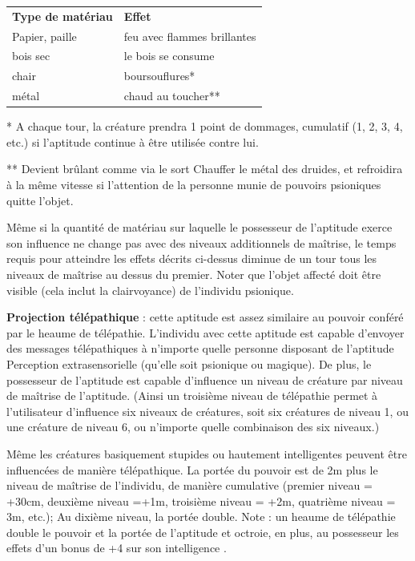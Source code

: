 \documentclass[11pt]{article}
\begin{document}
{\medskip

\begin{tabular}{p{8cm}p{8cm}}
\textbf{Type de matériau} & \textbf{Effet} \\
Papier, paille & feu avec flammes brillantes \\
bois sec & le bois se consume \\
chair & boursouflures* \\
métal & chaud au toucher** \\
\end{tabular}

\bigskip

* A chaque tour, la créature prendra 1 point de dommages, cumulatif (1, 2, 3, 4, etc.) si l'aptitude continue à être utilisée contre lui.

\bigskip

** Devient brûlant comme via le sort Chauffer le métal des druides, et refroidira à la même vitesse si l'attention de la personne munie de pouvoirs psioniques quitte l'objet.

\bigskip

Même si la quantité de matériau sur laquelle le possesseur de l'aptitude exerce son influence ne change pas avec des niveaux additionnels de maîtrise, le temps requis pour atteindre les effets décrits ci-dessus diminue de un tour tous les niveaux de maîtrise au dessus du premier. Noter que l'objet affecté doit être visible (cela inclut la clairvoyance) de l'individu psionique.

\bigskip

\textbf{Projection télépathique} : cette aptitude est assez similaire au pouvoir conféré par le heaume de télépathie. L'individu avec cette aptitude est capable d'envoyer des messages télépathiques à n'importe quelle personne  disposant de l'aptitude Perception extrasensorielle (qu'elle soit psionique ou magique). De plus, le possesseur de l'aptitude est capable d'influence un niveau de créature par niveau de maîtrise de l'aptitude. (Ainsi un troisième niveau de télépathie permet à l'utilisateur d'influence six niveaux de créatures, soit six créatures de niveau 1, ou une créature de niveau 6, ou n'importe quelle combinaison des six niveaux.)

\bigskip

Même les créatures basiquement stupides ou hautement intelligentes peuvent être influencées de manière télépathique. La portée du pouvoir est de 2m plus le niveau de maîtrise de l'individu, de manière cumulative (premier niveau = +30cm, deuxième niveau =+1m, troisième niveau = +2m, quatrième niveau = 3m, etc.); Au dixième niveau, la portée double. Note : un heaume de télépathie double le pouvoir et la portée de l'aptitude et octroie, en plus, au possesseur les effets d'un bonus de +4 sur son intelligence .

}
\end{document}
